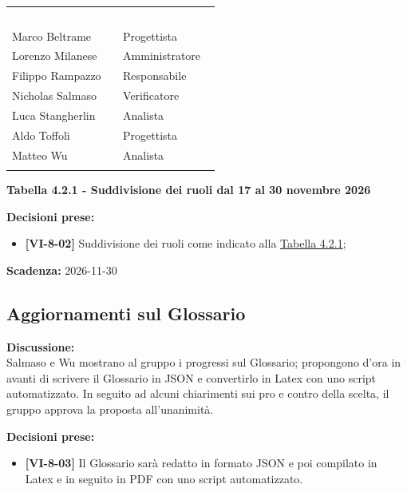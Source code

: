 \documentclass[12pt,a4paper]{article}
\newcommand{\tightlist}{\setlength{\itemsep}{1pt}\setlength{\parskip}{0pt}}
\begin{document}
\hypertarget{tab-4.2.1}{
\begin{center}
\begin{tabularx}{\linewidth}{>{\raggedright\arraybackslash}X>{\raggedright\arraybackslash}X}
\rowcolor{bfblue}\textcolor{white}{\textbf{Nome e Cognome}} & \textcolor{white}{\textbf{Ruolo Progetto}}\\
Marco Beltrame & Progettista \\ \arrayrulecolor{bfline}\hline
Lorenzo Milanese & Amministratore \\ \arrayrulecolor{bfline}\hline
Filippo Rampazzo & Responsabile \\ \arrayrulecolor{bfline}\hline
Nicholas Salmaso & Verificatore \\ \arrayrulecolor{bfline}\hline
Luca Stangherlin & Analista \\ \arrayrulecolor{bfline}\hline
Aldo Toffoli & Progettista \\ \arrayrulecolor{bfline}\hline
Matteo Wu & Analista \\ \arrayrulecolor{bfline}\hline
\end{tabularx}
\textbf{Tabella 4.2.1 - Suddivisione dei ruoli dal 17 al 30 novembre 2026}
\end{center}
}

\textbf{Decisioni prese:}
\begin{itemize}
\tightlist
\item[$\checkmark$] \textbf{[VI-8-02]} Suddivisione dei ruoli come indicato alla \hyperlink{tab-4.2.1}{Tabella 4.2.1};
\end{itemize}

\textbf{Scadenza:} 2026-11-30

\hypertarget{odg-3}{%
\subsection{Aggiornamenti sul Glossario}}
\textbf{Discussione:} \\
Salmaso e Wu mostrano al gruppo i progressi sul Glossario; propongono d'ora in avanti di scrivere il Glossario in JSON e convertirlo in Latex con uno script automatizzato. In seguito ad alcuni chiarimenti sui pro e contro della scelta, il gruppo approva la proposta all'unanimità.

\textbf{Decisioni prese:}
\begin{itemize}
\tightlist
\item[$\checkmark$] \textbf{[VI-8-03]} Il Glossario sarà redatto in formato JSON e poi compilato in Latex e in seguito in PDF con uno script automatizzato.
\end{itemize}
\end{document}
